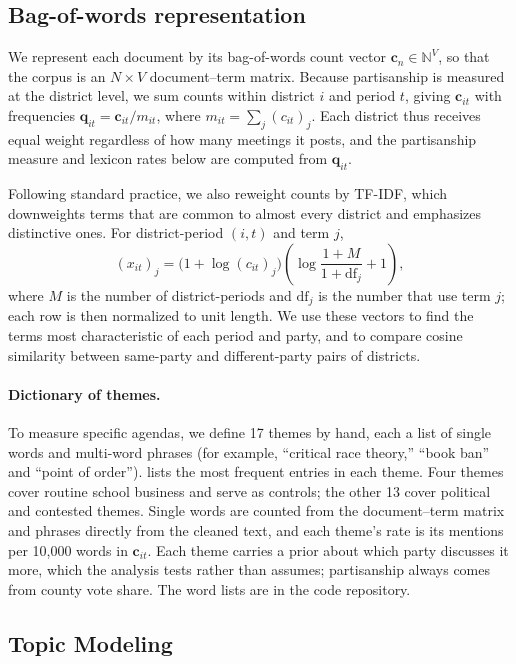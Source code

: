 \documentclass[12pt]{article}
\begin{document}
\subsection{Bag-of-words representation}\label{sec:m-bow}

We represent each document by its bag-of-words count vector
$\mathbf{c}_n \in \mathbb{N}^V$, so that the corpus is an $N \times V$
document--term matrix. Because partisanship is
measured at the district level, we sum counts within district $i$ and period $t$,
giving $\mathbf{c}_{it}$ with frequencies $\mathbf{q}_{it} = \mathbf{c}_{it}/m_{it}$,
where $m_{it} = \sum_j (c_{it})_j$. Each district thus receives equal weight regardless
of how many meetings it posts, and the partisanship measure and lexicon rates below
are computed from $\mathbf{q}_{it}$.

Following standard practice, we also reweight counts by TF-IDF, which downweights
terms that are common to almost every district and emphasizes distinctive ones. For
district-period $(i,t)$ and term $j$,
\[
  (x_{it})_j = \bigl(1 + \log (c_{it})_j\bigr)\left(\log\frac{1 + M}{1 + \mathrm{df}_j} + 1\right),
\]
where $M$ is the number of district-periods and $\mathrm{df}_j$ is the number that use
term $j$; each row is then normalized to unit length. We use these vectors to find
the terms most characteristic of each period and party, and to compare cosine
similarity between same-party and different-party pairs of districts.

\paragraph{Dictionary of themes.}
To measure specific agendas, we define 17 themes by hand, each a list of single
words and multi-word phrases (for example, ``critical race theory,'' ``book ban''
and ``point of order'').  lists the most frequent entries in each theme. Four themes cover routine school business and serve as
controls; the other 13 cover political and contested themes. Single words are
counted from the document--term matrix and phrases directly from the cleaned text,
and each theme's rate is its mentions per 10,000 words in $\mathbf{c}_{it}$. Each
theme carries a prior about which party discusses it more, which the analysis tests
rather than assumes; partisanship always comes from county vote share. The word
lists are in the code repository.


\subsection{Topic Modeling}\label{sec:m-comm}
\end{document}
